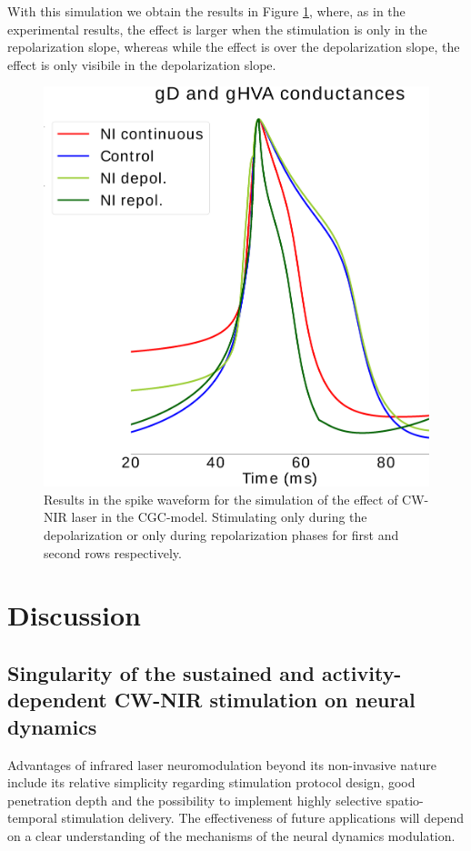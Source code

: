 With this simulation we obtain the results in Figure \ref{fig:activity dependent simulation results}, where, as in the experimental results, the effect is larger when the stimulation is only in the repolarization slope, whereas while the effect is over the depolarization slope, the effect is only visibile in the depolarization slope. 

\begin{figure}[htb!]
	\includegraphics[width=\textwidth]{img/laser/activity-dependent-model/depol_combined.png}
	\caption{Results in the spike waveform for the simulation of the effect of CW-NIR laser in the CGC-model. Stimulating only during the depolarization or only during repolarization phases for first and second rows respectively.}
	\label{fig:activity dependent simulation results}
\end{figure}


\section{Discussion}
\subsection{Singularity of the sustained and activity-dependent CW-NIR stimulation on neural dynamics}
Advantages of infrared laser neuromodulation beyond its non-invasive nature include its relative simplicity regarding stimulation protocol design, good penetration depth and the possibility to implement highly selective spatio-temporal stimulation delivery. The effectiveness of future applications will depend on a clear understanding of the mechanisms of the neural dynamics modulation.

